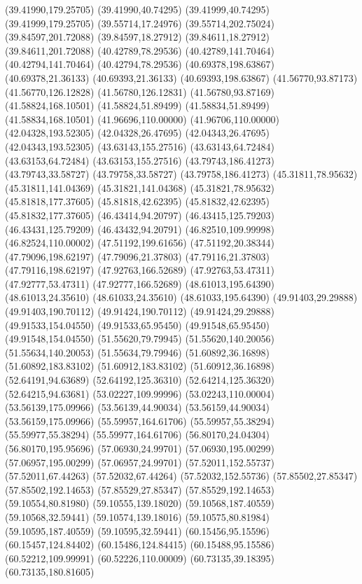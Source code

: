 {(39.41990,179.25705) (39.41990,40.74295) (39.41999,40.74295) (39.41999,179.25705) (39.55714,17.24976) (39.55714,202.75024) (39.84597,201.72088) (39.84597,18.27912)
(39.84611,18.27912) (39.84611,201.72088) (40.42789,78.29536) (40.42789,141.70464) (40.42794,141.70464) (40.42794,78.29536) (40.69378,198.63867) (40.69378,21.36133)
(40.69393,21.36133) (40.69393,198.63867) (41.56770,93.87173) (41.56770,126.12828) (41.56780,126.12831) (41.56780,93.87169) (41.58824,168.10501) (41.58824,51.89499)
(41.58834,51.89499) (41.58834,168.10501) (41.96696,110.00000) (41.96706,110.00000) (42.04328,193.52305) (42.04328,26.47695) (42.04343,26.47695) (42.04343,193.52305)
(43.63143,155.27516) (43.63143,64.72484) (43.63153,64.72484) (43.63153,155.27516) (43.79743,186.41273) (43.79743,33.58727) (43.79758,33.58727) (43.79758,186.41273)
(45.31811,78.95632) (45.31811,141.04369) (45.31821,141.04368) (45.31821,78.95632) (45.81818,177.37605) (45.81818,42.62395) (45.81832,42.62395) (45.81832,177.37605)
(46.43414,94.20797) (46.43415,125.79203) (46.43431,125.79209) (46.43432,94.20791) (46.82510,109.99998) (46.82524,110.00002) (47.51192,199.61656) (47.51192,20.38344)
(47.79096,198.62197) (47.79096,21.37803) (47.79116,21.37803) (47.79116,198.62197) (47.92763,166.52689) (47.92763,53.47311) (47.92777,53.47311) (47.92777,166.52689)
(48.61013,195.64390) (48.61013,24.35610) (48.61033,24.35610) (48.61033,195.64390) (49.91403,29.29888) (49.91403,190.70112) (49.91424,190.70112) (49.91424,29.29888)
(49.91533,154.04550) (49.91533,65.95450) (49.91548,65.95450) (49.91548,154.04550) (51.55620,79.79945) (51.55620,140.20056) (51.55634,140.20053) (51.55634,79.79946)
(51.60892,36.16898) (51.60892,183.83102) (51.60912,183.83102) (51.60912,36.16898) (52.64191,94.63689) (52.64192,125.36310) (52.64214,125.36320) (52.64215,94.63681)
(53.02227,109.99996) (53.02243,110.00004) (53.56139,175.09966) (53.56139,44.90034) (53.56159,44.90034) (53.56159,175.09966) (55.59957,164.61706) (55.59957,55.38294)
(55.59977,55.38294) (55.59977,164.61706) (56.80170,24.04304) (56.80170,195.95696) (57.06930,24.99701) (57.06930,195.00299) (57.06957,195.00299) (57.06957,24.99701)
(57.52011,152.55737) (57.52011,67.44263) (57.52032,67.44264) (57.52032,152.55736) (57.85502,27.85347) (57.85502,192.14653) (57.85529,27.85347) (57.85529,192.14653)
(59.10554,80.81980) (59.10555,139.18020) (59.10568,187.40559) (59.10568,32.59441) (59.10574,139.18016) (59.10575,80.81984) (59.10595,187.40559) (59.10595,32.59441)
(60.15456,95.15596) (60.15457,124.84402) (60.15486,124.84415) (60.15488,95.15586) (60.52212,109.99991) (60.52226,110.00009) (60.73135,39.18395) (60.73135,180.81605)
}
